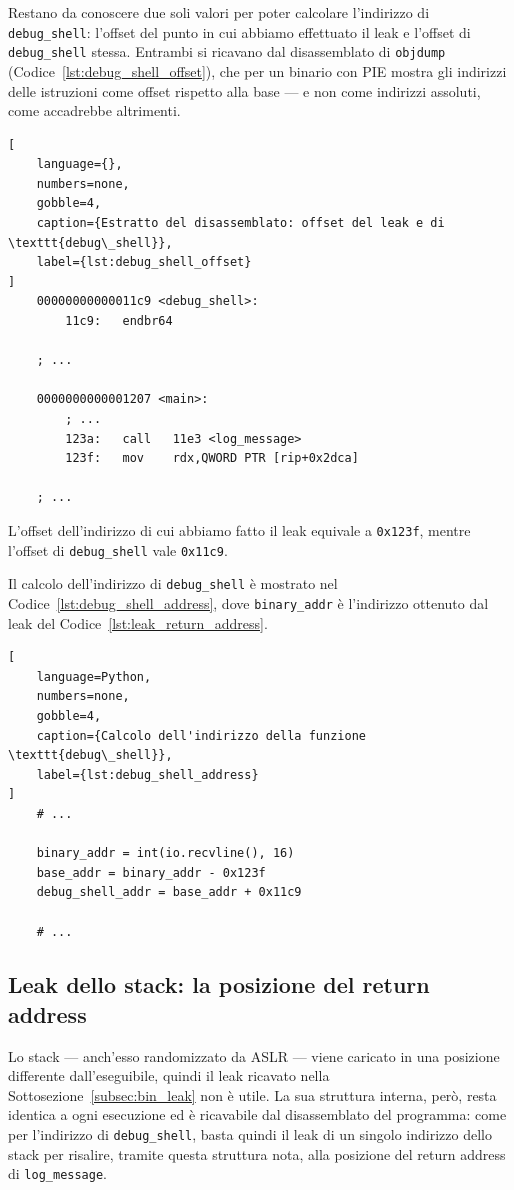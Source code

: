 Restano da conoscere due soli valori per poter calcolare l'indirizzo di \texttt{debug\_shell}: l'offset del punto in cui abbiamo effettuato il leak e l'offset di \texttt{debug\_shell} stessa. Entrambi si ricavano dal disassemblato di \texttt{objdump} (Codice~\ref{lst:debug_shell_offset}), che per un binario con PIE mostra gli indirizzi delle istruzioni come offset rispetto alla base --- e non come indirizzi assoluti, come accadrebbe altrimenti.
\begin{lstlisting}[
    language={},
    numbers=none,
    gobble=4,
    caption={Estratto del disassemblato: offset del leak e di \texttt{debug\_shell}},
    label={lst:debug_shell_offset}
]
    00000000000011c9 <debug_shell>:
        11c9:	endbr64

    ; ...

    0000000000001207 <main>:
        ; ...
        123a:	call   11e3 <log_message>
        123f:	mov    rdx,QWORD PTR [rip+0x2dca]

    ; ...
\end{lstlisting}
L'offset dell'indirizzo di cui abbiamo fatto il leak equivale a \texttt{0x123f}, mentre l'offset di \texttt{debug\_shell} vale \texttt{0x11c9}.

Il calcolo dell'indirizzo di \texttt{debug\_shell} è mostrato nel Codice~\ref{lst:debug_shell_address}, dove \texttt{binary\_addr} è l'indirizzo ottenuto dal leak del Codice~\ref{lst:leak_return_address}.
\begin{lstlisting}[
    language=Python,
    numbers=none,
    gobble=4,
    caption={Calcolo dell'indirizzo della funzione \texttt{debug\_shell}},
    label={lst:debug_shell_address}
]
    # ...

    binary_addr = int(io.recvline(), 16)
    base_addr = binary_addr - 0x123f
    debug_shell_addr = base_addr + 0x11c9

    # ...
\end{lstlisting}

\subsection{Leak dello stack: la posizione del return address}\label{subsec:stack_leak}
Lo stack --- anch'esso randomizzato da ASLR --- viene caricato in una posizione differente dall'eseguibile, quindi il leak ricavato nella Sottosezione~\ref{subsec:bin_leak} non è utile. La sua struttura interna, però, resta identica a ogni esecuzione ed è ricavabile dal disassemblato del programma: come per l'indirizzo di \texttt{debug\_shell}, basta quindi il leak di un singolo indirizzo dello stack per risalire, tramite questa struttura nota, alla posizione del return address di \texttt{log\_message}.

